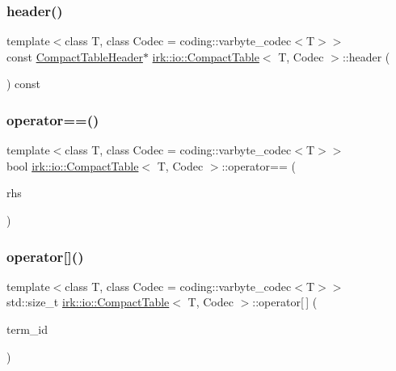 \subsubsection{\texorpdfstring{header()}{header()}}
{\footnotesize\ttfamily template$<$class T, class Codec = coding\+::varbyte\+\_\+codec$<$\+T$>$$>$ \\
const \mbox{\hyperlink{structirk_1_1io_1_1CompactTableHeader}{Compact\+Table\+Header}}$\ast$ \mbox{\hyperlink{classirk_1_1io_1_1CompactTable}{irk\+::io\+::\+Compact\+Table}}$<$ T, Codec $>$\+::header (\begin{DoxyParamCaption}{ }\end{DoxyParamCaption}) const\hspace{0.3cm}{\ttfamily [inline]}}

\mbox{\label{classirk_1_1io_1_1CompactTable_afd291823aa610f9c1bc2eb1a6f5f21c0}} 
\subsubsection{\texorpdfstring{operator==()}{operator==()}}
{\footnotesize\ttfamily template$<$class T, class Codec = coding\+::varbyte\+\_\+codec$<$\+T$>$$>$ \\
bool \mbox{\hyperlink{classirk_1_1io_1_1CompactTable}{irk\+::io\+::\+Compact\+Table}}$<$ T, Codec $>$\+::operator== (\begin{DoxyParamCaption}\item[{const \mbox{\hyperlink{classirk_1_1io_1_1CompactTable}{Compact\+Table}}$<$ T, Codec $>$ \&}]{rhs }\end{DoxyParamCaption})\hspace{0.3cm}{\ttfamily [inline]}}

\mbox{\label{classirk_1_1io_1_1CompactTable_a97e7ae09cdee4060a25d74e062b517ca}} 
\subsubsection{\texorpdfstring{operator[]()}{operator[]()}\hspace{0.1cm}{\footnotesize\ttfamily [1/2]}}
{\footnotesize\ttfamily template$<$class T, class Codec = coding\+::varbyte\+\_\+codec$<$\+T$>$$>$ \\
std\+::size\+\_\+t \mbox{\hyperlink{classirk_1_1io_1_1CompactTable}{irk\+::io\+::\+Compact\+Table}}$<$ T, Codec $>$\+::operator\mbox{[}$\,$\mbox{]} (\begin{DoxyParamCaption}\item[{std\+::size\+\_\+t}]{term\+\_\+id }\end{DoxyParamCaption})\hspace{0.3cm}{\ttfamily [inline]}}

